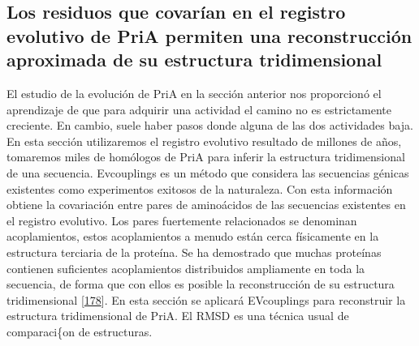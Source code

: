 \documentclass[12pt,twoside]{reedthesis}
\begin{document}
  \clearpage  
  
  \subsection{Los residuos que covarían en el registro evolutivo de PriA
  permiten una reconstrucción aproximada de su estructura
  tridimensional}\label{los-residuos-que-covarian-en-el-registro-evolutivo-de-pria-permiten-una-reconstruccion-aproximada-de-su-estructura-tridimensional}
  
  El estudio de la evolución de PriA en la sección anterior nos
  proporcionó el aprendizaje de que para adquirir una actividad el camino
  no es estrictamente creciente. En cambio, suele haber pasos donde alguna
  de las dos actividades baja. En esta sección utilizaremos el registro
  evolutivo resultado de millones de años, tomaremos miles de homólogos de
  PriA para inferir la estructura tridimensional de una secuencia.
  Evcouplings es un método que considera las secuencias génicas existentes
  como experimentos exitosos de la naturaleza. Con esta información
  obtiene la covariación entre pares de aminoácidos de las secuencias
  existentes en el registro evolutivo. Los pares fuertemente relacionados
  se denominan acoplamientos, estos acoplamientos a menudo están cerca
  físicamente en la estructura terciaria de la proteína. Se ha demostrado
  que muchas proteínas contienen suficientes acoplamientos distribuidos
  ampliamente en toda la secuencia, de forma que con ellos es posible la
  reconstrucción de su estructura tridimensional
  {[}\protect\hyperlink{ref-marks_protein_2011}{178}{]}. En esta sección
  se aplicará EVcouplings para reconstruir la estructura tridimensional de
  PriA. El RMSD es una técnica usual de comparaci\{on de estructuras.
  
\end{document}
